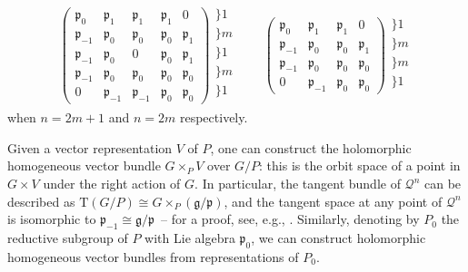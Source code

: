 \documentclass[10pt,a4paper]{amsart}
\numberwithin{equation}{section}
\newcommand{\mc} [1]{\mathcal{#1}}
\newcommand{\Tgt} {\mathrm{T}}
\newcommand{\g} {\mathfrak{g}}
\newcommand{\mfp} {\mathfrak{p}}
\begin{document}
\begin{gather*}
\left(
 \begin{array}{c|c|c|c|c}
\mfp_0 & \mfp_1 & \mfp_1 & \mfp_1 & 0 \\\hline 
\mfp_{-1} & \mfp_0 & \mfp_0 & \mfp_0 & \mfp_1 \\\hline 
\mfp_{-1} & \mfp_0 & 0 & \mfp_0 & \mfp_1 \\\hline 
\mfp_{-1} & \mfp_0 & \mfp_0 & \mfp_0 & \mfp_0 \\\hline 
0 & \mfp_{-1} & \mfp_{-1} & \mfp_0 & \mfp_0
\end{array} \right)
\begin{array}{l}
\} \scriptscriptstyle{1} \\ \} \scriptscriptstyle{m} \\ \} \scriptscriptstyle{1} \\ \} \scriptscriptstyle{m} \\ \} \scriptscriptstyle{1} \\
\end{array}
\qquad
\left(
 \begin{array}{c|c|c|c}
\mfp_0 & \mfp_1 & \mfp_1 & 0 \\\hline 
\mfp_{-1} & \mfp_0 & \mfp_0 & \mfp_1 \\\hline 
\mfp_{-1} & \mfp_0 & \mfp_0 & \mfp_0 \\\hline 
0 & \mfp_{-1} & \mfp_0 & \mfp_0
\end{array}
\right)
 \begin{array}{l}
\} \scriptscriptstyle{1} \\ \} \scriptscriptstyle{m} \\ \} \scriptscriptstyle{m} \\ \} \scriptscriptstyle{1} \\
\end{array}
\end{gather*}
when $n=2m+1$ and $n=2m$ respectively.

Given a vector representation $V$ of $P$, one can construct the holomorphic homogeneous vector bundle $G \times_P V$ over $G/P$: this is the orbit space of a point in $G \times V$ under the right action of $G$. In particular, the tangent bundle of $\mc{Q}^n$ can be described as $\Tgt (G/P) \cong G \times_P \left( \g/\mfp \right)$, and the tangent space at any point of $\mc{Q}^n$ is isomorphic to $\mfp_{-1} \cong \g/\mfp$~-- for a proof, see, e.g., \cite{vCap2009}. Similarly, denoting by $P_0$ the reductive subgroup of $P$ with Lie algebra $\mfp_0$, we can construct holomorphic homogeneous vector bundles from representations of $P_0$.
\end{document}
